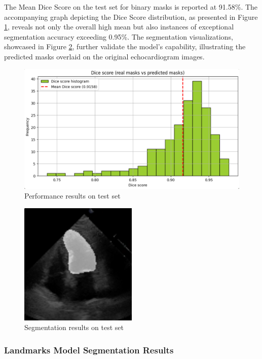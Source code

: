 \documentclass[runningheads]{llncs}
\begin{document}
The Mean Dice Score on the test set for binary masks is reported at 91.58\%. The accompanying graph depicting the Dice Score distribution, as presented in Figure \ref{fig:histogramam}, reveals not only the overall high mean but also instances of exceptional segmentation accuracy exceeding 0.95\%. The segmentation visualizations, showcased in Figure \ref{fig:ms}, further validate the model's capability, illustrating the predicted masks overlaid on the original echocardiogram images.

\begin{figure}[H]
    \centering
    \includegraphics[width=1.0\textwidth]{histogramam.jpg}
    \caption{Performance results on test set}
    \label{fig:histogramam}
\end{figure}

\begin{figure}[H]
    \centering
    \includegraphics[width=0.5\textwidth]{ms.jpg}
    \caption{Segmentation results on test set}
    \label{fig:ms}
\end{figure}

\subsubsection{Landmarks Model Segmentation Results}
\end{document}
